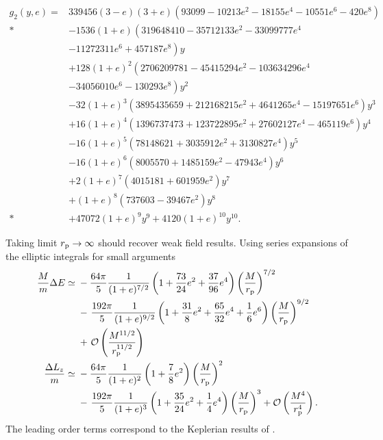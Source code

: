\begin{align}
g_2(y, e) = {} & 339456 (3 - e) (3 + e) \left(93099 - 10213 e^2 - 18155 e^4 - 10551 e^6 - 420 e^8 \right) \nonumber \\*
 {} & - \left. 1536 (1 + e) \left(319648410 - 35712133 e^2 - 33099777 e^4  \right.\right. \nonumber \\
 {} & - \left.\left. 11272311 e^6 +457187 e^8\right) y \right. \nonumber \\
 {} & + \left. 128 (1 + e)^2 \left(2706209781 - 45415294 e^2 - 103634296 e^4 \right.\right. \nonumber \\
 {} & - \left.\left. 34056010 e^6 - 130293 e^8\right) y^2 \right. \nonumber \\
 {} & - \left. 32 (1 + e)^3 \left(3895435659 + 212168215 e^2 + 4641265 e^4 - 15197651 e^6 \right) y^3 \right. \nonumber \\
 {} & + \left. 16 (1 + e)^4 \left(1396737473 + 123722895 e^2 + 27602127 e^4 - 465119 e^6 \right) y^4 \right. \nonumber \\
 {} & - \left. 16 (1 + e)^5 \left(78148621 + 3035912 e^2 + 3130827 e^4\right) y^5 \right. \nonumber \\
 {} & - \left. 16 (1 + e)^6 \left(8005570 + 1485159 e^2 - 47943 e^4\right) y^6 \right. \nonumber \\
 {} & + \left. 2 (1 + e)^7 \left(4015181 + 601959 e^2\right) y^7 \right. \nonumber \\
 {} & + \left. (1 + e)^8 \left(737603 - 39467 e^2\right) y^8 \right. \nonumber \\*
 {} & + \left. 47072 (1 + e)^9 y^9 + 4120 (1 + e)^{10} y^{10}. \right.
\end{align}

Taking limit $r_\mathrm{p} \rightarrow \infty$ should recover weak field results. Using series expansions of the elliptic integrals for small arguments
\begin{align}
\frac{M}{m} \Delta E \simeq {} & -\frac{64\pi}{5} \frac{1}{(1 + e)^{{7}/{2}}} \left(1 + \frac{73}{24} e^2 + \frac{37}{96} e^{4}\right) \left(\frac{M}{r_\mathrm{p}}\right)^{7/2} \nonumber \\
 {} & - \left. \frac{192\pi}{5} \frac{1}{(1 + e)^{{9}/{2}}} \left(1 + \frac{31}{8} e^2 + \frac{65}{32} e^4 + \frac{1}{6}e^6\right) \left(\frac{M}{r_\mathrm{p}}\right)^{9/2} \right. \nonumber \\*
 {} & + \left. \mathcal{O}\left({\frac{M^{11/2}}{r_\mathrm{p}^{11/2}}}\right) \right. \\
\frac{\Delta L_{z}}{m} \simeq {} & -\frac{64\pi}{5} \frac{1}{(1 + e)^{2}} \left(1 + \frac{7}{8} e^{2}\right) \left(\frac{M}{r_\mathrm{p}}\right)^{2} \nonumber \\
 {} & - \left. \frac{192 \pi}{5} \frac{1}{(1 + e)^3} \left(1 + \frac{35}{24} e^2 + \frac{1}{4} e^4\right) \left(\frac{M}{r_\mathrm{p}}\right)^{3}  + \mathcal{O}\left({\frac{M^{4}}{r_\mathrm{p}^{4}}}\right). \right.
\end{align}
The leading order terms correspond to the Keplerian results of \cite{Peters1964}.

